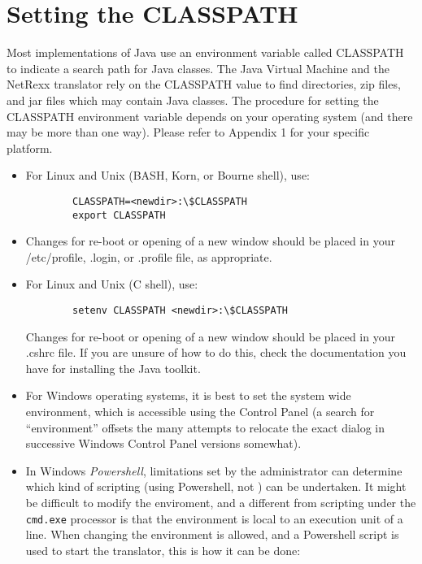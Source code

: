 \section{Setting the CLASSPATH}
Most implementations of Java use an environment variable called CLASSPATH to indicate a search path for Java classes. The Java Virtual Machine and the NetRexx translator rely on the CLASSPATH value to find directories, zip files, and jar files which may contain Java classes. 
The procedure for setting the CLASSPATH environment variable depends on your operating system (and there may be more than one way). Please refer to Appendix 1 for your specific platform.
\begin{itemize}
\item For Linux and Unix (BASH, Korn, or Bourne shell), use:
\begin{verbatim}
        CLASSPATH=<newdir>:\$CLASSPATH 
        export CLASSPATH
\end{verbatim}

\item Changes for re-boot or opening of a new window should be placed in your /etc/profile, .login, or .profile file, as appropriate. 
\item For Linux and Unix (C shell), use:
\begin{verbatim}
        setenv CLASSPATH <newdir>:\$CLASSPATH 
\end{verbatim}
Changes for re-boot or opening of a new window should be placed in
your .cshrc file. If you are unsure of how to do this, check the
documentation you have for installing the Java toolkit.
\item For Windows operating systems, it is best to set the system wide
  environment, which is accessible using the Control Panel (a search
  for ``environment'' offsets the many attempts to relocate the exact
  dialog in successive Windows Control Panel versions somewhat).
\item In Windows \emph{Powershell}, limitations set by the
  administrator can determine which kind of scripting (using
  Powershell, not \nr) can be undertaken. It might be difficult to
  modify the enviroment, and a different from scripting under the
  \texttt{cmd.exe} processor is that the environment is local to an
  execution unit of a line. When changing the environment is allowed,
  and a Powershell script is used to start the \nr translator, this is
  how it can be done:
 
\end{itemize}


